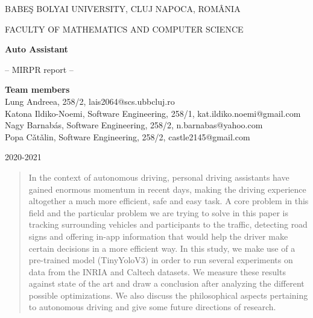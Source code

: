 \documentclass[runningheads,a4paper,11pt]{report}
\begin{document}
\begin{titlepage}
\sloppy

\begin{center}
BABE\c S BOLYAI UNIVERSITY, CLUJ NAPOCA, ROM\^ ANIA

FACULTY OF MATHEMATICS AND COMPUTER SCIENCE

\vspace{6cm}

\Huge \textbf{Auto Assistant}

\vspace{1cm}

\normalsize -- MIRPR report --

\end{center}


\vspace{5cm}

\begin{flushright}
\Large{\textbf{Team members}}\\
Lung Andreea, 258/2, lais2064@scs.ubbcluj.ro\\
Katona Ildiko-Noemi, Software Engineering, 258/1, kat.ildiko.noemi@gmail.com\\
Nagy Barnab\' as, Software Engineering, 258/2, n.barnabas@yahoo.com\\
Popa C\v{a}t\v{a}lin, Software Engineering, 258/2, castle2145@gmail.com\\
\end{flushright}

\vspace{4cm}

\begin{center}
2020-2021
\end{center}

\end{titlepage}


\begin{abstract}
	
	In the context of autonomous driving, personal driving assistants have gained enormous momentum in recent days, making the driving experience altogether a much more efficient, safe and easy task. A core problem in this field and the particular problem we are trying to solve in this paper is tracking surrounding vehicles and participants to the traffic, detecting road signs and offering in-app information that would help the driver make certain decisions in a more efficient way. In this study, we make use of a pre-trained model (TinyYoloV3) in order to run several experiments on data from the INRIA and Caltech datasets. We measure these results against state of the art and draw a conclusion after analyzing the different possible optimizations. We also discuss the philosophical aspects pertaining to autonomous driving and give some future directions of research.

\end{abstract}
\end{document}

